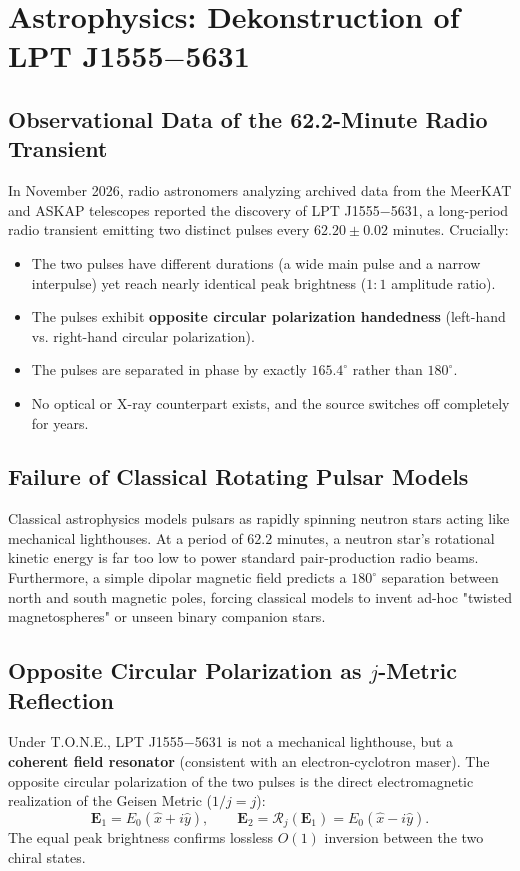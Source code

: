 \documentclass[11pt,a4paper,oneside]{article}
\def\texttt#1{#1}%
\theoremstyle{definition}
\begin{document}
\section{Astrophysics: Dekonstruction of LPT J1555$-$5631}
\subsection{Observational Data of the 62.2-Minute Radio Transient}
In November 2026, radio astronomers analyzing archived data from the MeerKAT and ASKAP telescopes reported the discovery of \texttt{LPT J1555$-$5631}, a long-period radio transient emitting two distinct pulses every $62.20 \pm 0.02$ minutes. Crucially:
\begin{itemize}
\item The two pulses have different durations (a wide main pulse and a narrow interpulse) yet reach nearly identical peak brightness ($1:1$ amplitude ratio).
\item The pulses exhibit \textbf{opposite circular polarization handedness} (left-hand vs. right-hand circular polarization).
\item The pulses are separated in phase by exactly \textbf{$165.4^\circ$} rather than $180^\circ$.
\item No optical or X-ray counterpart exists, and the source switches off completely for years.
\end{itemize}
\subsection{Failure of Classical Rotating Pulsar Models}
Classical astrophysics models pulsars as rapidly spinning neutron stars acting like mechanical lighthouses. At a period of $62.2$ minutes, a neutron star's rotational kinetic energy is far too low to power standard pair-production radio beams. Furthermore, a simple dipolar magnetic field predicts a $180^\circ$ separation between north and south magnetic poles, forcing classical models to invent ad-hoc "twisted magnetospheres" or unseen binary companion stars.
\subsection{Opposite Circular Polarization as $j$-Metric Reflection}
Under T.O.N.E., \texttt{LPT J1555$-$5631} is not a mechanical lighthouse, but a \textbf{coherent field resonator} (consistent with an electron-cyclotron maser). The opposite circular polarization of the two pulses is the direct electromagnetic realization of the Geisen Metric ($1/j = j$):
\begin{equation}
\mathbf{E}_1 = E_0 (\hat{x} + i\hat{y}), \qquad \mathbf{E}_2 = \mathcal{R}_j(\mathbf{E}_1) = E_0 (\hat{x} - i\hat{y}).
\end{equation}
The equal peak brightness confirms lossless $O(1)$ inversion between the two chiral states.
\end{document}
